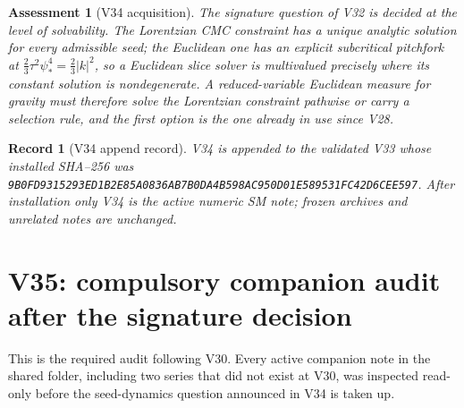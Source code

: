 \documentclass[11pt]{article}
\newtheorem{assessment}[theorem]{Assessment}
\newtheorem{record}[theorem]{Record}
\theoremstyle{remark}
\begin{document}
\begin{assessment}[V34 acquisition]
\label{ass:v19v34}
The signature question of V32 is decided at the level of solvability.
The Lorentzian CMC constraint has a unique analytic solution for every
admissible seed; the Euclidean one has an explicit subcritical pitchfork
at \(\tfrac23\tau^2\psi_*^4=\tfrac23|k|^2\), so a Euclidean slice solver
is multivalued precisely where its constant solution is nondegenerate.
A reduced-variable Euclidean measure for gravity must therefore solve
the Lorentzian constraint pathwise or carry a selection rule, and the
first option is the one already in use since V28.
\end{assessment}

\begin{record}[V34 append record]
\label{rec:v19v34}
V34 is appended to the validated V33 whose installed SHA--256 was
\texttt{9B0FD9315293ED1B2E85A0836AB7B0DA4B598AC950D01E589531FC42D6CEE597}.
After installation only V34 is the active numeric SM note; frozen
archives and unrelated notes are unchanged.
\end{record}


\section{V35: compulsory companion audit after the signature decision}
\label{sec:v19v35}

This is the required audit following V30.  Every active companion note in
the shared folder, including two series that did not exist at V30, was
inspected read-only before the seed-dynamics question announced in V34 is
taken up.
\end{document}
